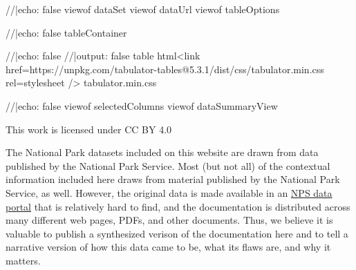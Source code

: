 \documentclass[
  letterpaper,
  DIV=11,
  numbers=noendperiod]{scrartcl}
\newenvironment{Shaded}{\begin{snugshade}}{\end{snugshade}}
\newcommand{\NormalTok}[1]{\textcolor[rgb]{0.00,0.23,0.31}{#1}}
\begin{document}
\begin{Shaded}
\begin{Highlighting}[]
\NormalTok{//|echo: false}
\NormalTok{viewof dataSet}
\NormalTok{viewof dataUrl}
\NormalTok{viewof tableOptions}
\end{Highlighting}
\end{Shaded}

\begin{Shaded}
\begin{Highlighting}[]
\NormalTok{//|echo: false}
\NormalTok{tableContainer}
\end{Highlighting}
\end{Shaded}

\begin{Shaded}
\begin{Highlighting}[]
\NormalTok{//|echo: false}
\NormalTok{//|output: false}
\NormalTok{table}
\NormalTok{html\textasciigrave{}\textless{}link href=\textquotesingle{}https://unpkg.com/tabulator{-}tables@5.3.1/dist/css/tabulator.min.css\textquotesingle{} rel=\textquotesingle{}stylesheet\textquotesingle{} /\textgreater{}}
\NormalTok{tabulator.min.css\textasciigrave{}}
\end{Highlighting}
\end{Shaded}

\begin{Shaded}
\begin{Highlighting}[]
\NormalTok{//|echo: false}
\NormalTok{viewof selectedColumns}
\NormalTok{viewof dataSummaryView}
\end{Highlighting}
\end{Shaded}

\begin{tcolorbox}[enhanced jigsaw, colframe=quarto-callout-tip-color-frame, titlerule=0mm, breakable, toprule=.15mm, opacitybacktitle=0.6, left=2mm, colback=white, bottomrule=.15mm, arc=.35mm, colbacktitle=quarto-callout-tip-color!10!white, bottomtitle=1mm, toptitle=1mm, title={Creative Commons License}, coltitle=black, rightrule=.15mm, opacityback=0, leftrule=.75mm]

This work is licensed under CC BY 4.0

\end{tcolorbox}

The National Park datasets included on this website are drawn from data
published by the National Park Service. Most (but not all) of the
contextual information included here draws from material published by
the National Park Service, as well. However, the original data is made
available in an \href{https://irma.nps.gov/Stats/}{NPS data portal} that
is relatively hard to find, and the documentation is distributed across
many different web pages, PDFs, and other documents. Thus, we believe it
is valuable to publish a synthesized verison of the documentation here
and to tell a narrative version of how this data came to be, what its
flaws are, and why it matters.
\end{document}
